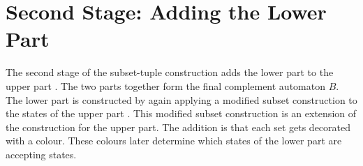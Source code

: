 




\section{Second Stage: Adding the Lower Part}
The second stage of the subset-tuple construction adds the lower part to the upper part \Bp. The two parts together form the final complement automaton $B$. The lower part is constructed by again applying a modified subset construction to the states of the upper part \Bp. This modified subset construction is an extension of the construction for the upper part. The addition is that each set gets decorated with a colour. These colours later determine which states of the lower part are accepting states.

